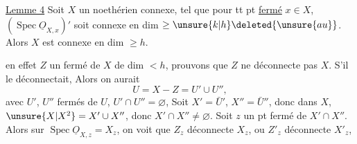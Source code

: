 
\uline{Lemme 4} Soit $X$ un 
noethérien connexe, 
tel que pour tt pt \uline{fermé} $x\in X$, $(\operatorname{Spec}\underline{O}_{X,x})'$ soit connexe
en dim $\geq\unsure{k|h}\deleted{\unsure{au}}$. Alors $X$ est connexe
en dim $\geq h$.


 en effet  $Z$ un
fermé de $X$ de dim $<h$,
prouvons que $Z$ ne déconnecte pas $X$.
 S'il le déconnectait,
Alors on aurait
\[
U=X-Z=U'\cup U'',
\]
avec $U'$, $U''$ fermés de $U$, $U'\cap U''=\varnothing$,
Soit $X'=\bar U'$, $X''=\bar U''$, donc 
dans $X$, $\unsure{X|X^2}=X'\cup X''$, donc $X'\cap X''\ne\varnothing$.
Soit $z$ un pt fermé de $X'\cap X''$.
Alors  sur $\operatorname{Spec}\underline{O}_{X,z}=X_z$,
on voit que $Z_z$ déconnecte $X_z$,
ou $Z'_z$ déconnecte $X'_z$, 

